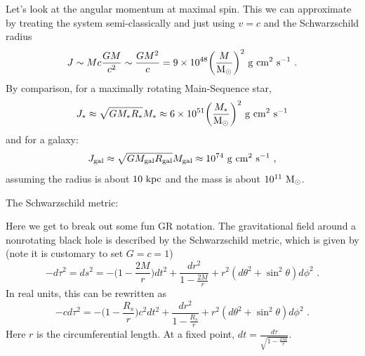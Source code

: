 Let's look at the angular momentum at maximal spin. This we can approximate by treating the system semi-classically and just using $v = c$ and the Schwarzschild radius
\begin{equation}
J \sim Mc \frac{GM}{c^2} \sim \frac{GM^2}{c} = 9 \times 10^{48} \biggl( \frac{M}{{\rm M}_\odot} \biggr)^2 ~{\rm g}~{\rm cm}^2~{\rm s}^{-1}\,\,.
\end{equation}
By comparison, for a maximally rotating Main-Sequence star,
\begin{equation}
J_* \approx \sqrt{G M_* R_*} M_* \approx 6 \times 10^{51}\biggl( \frac{M_*}{{\rm M}_\odot} \biggr)^2 ~{\rm g}~{\rm cm}^2~{\rm s}^{-1}
\end{equation}
and for a galaxy:
\begin{equation}
J_{\rm gal} \approx \sqrt{G M_{\rm gal} R_{\rm gal}} M_{\rm gal} \approx 10^{74}~{\rm g}~{\rm cm}^2~{\rm s}^{-1}\,\, ,
\end{equation}
assuming the radius is about $10~{\rm kpc}$ and the mass is about $10^{11}~\rm{M}_\odot$.

The Schwarzschild metric:

Here we get to break out some fun GR notation. The gravitational field around a nonrotating black hole is described by the Schwarzschild metric, which is given by (note it is customary to set $G = c = 1$)
\begin{equation}
-d\tau^2 = ds^2 = -\biggl( 1 - \frac{2M}{r} \biggr) dt^2 + \frac{dr^2}{1 - \frac{2M}{r}} + r^2(d\theta^2 + \sin^2\theta) d\phi^2\,\,.
\end{equation}
In real units, this can be rewritten as
\begin{equation}
-c d\tau^2 = -\biggl( 1 - \frac{R_s}{r} \biggr) c^2 dt^2 + \frac{dr^2}{1 - \frac{R_s}{r}} + r^2(d\theta^2 + \sin^2\theta) d\phi^2\,\,.
\end{equation}
Here $r$ is the circumferential length. At a fixed point, $dt = \frac{d\tau}{\sqrt{1 - \frac{2M}{r}}}$. 

